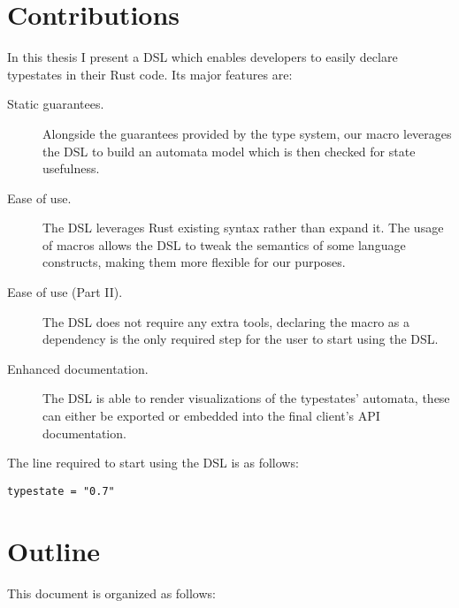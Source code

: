 \section{Contributions}\label{sec:objectives}

In this thesis I present a \gls{DSL} which enables developers to easily declare typestates in their Rust code.
Its major features are:

\begin{description}
    \item[Static guarantees.] Alongside the guarantees provided by the type system,
    our macro leverages the \gls{DSL} to build an automata model which is then checked for state usefulness.
    \item[Ease of use.] The \gls{DSL} leverages Rust existing syntax rather than expand it.
    The usage of macros allows the \gls{DSL} to tweak the semantics of some language constructs,
    making them more flexible for our purposes.
    \item[Ease of use (Part II).] The \gls{DSL} does not require any extra tools,
    declaring the macro as a dependency is the only required step for the user to start using the \gls{DSL}.
    \item[Enhanced documentation.] The \gls{DSL} is able to render visualizations of the typestates' automata,
    these can either be exported or embedded into the final client's \gls{API} documentation.
\end{description}

The line required to start using the DSL is as follows:
\begin{verbatim}
typestate = "0.7"
\end{verbatim}

\section{Outline}\label{sec:organization}

This document is organized as follows:

